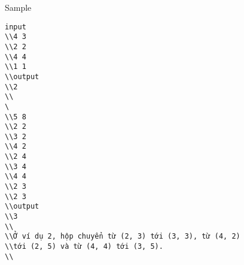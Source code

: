 Sample
\begin{verbatim}
input
\\4 3
\\2 2
\\4 4
\\1 1
\\output
\\2
\\
\
\\5 8
\\2 2
\\3 2
\\4 2
\\2 4
\\3 4
\\4 4
\\2 3
\\2 3
\\output
\\3
\\
\\Ở ví dụ 2, hộp chuyển từ (2, 3) tới (3, 3), từ (4, 2)
\\tới (2, 5) và từ (4, 4) tới (3, 5).
\\\end{verbatim}